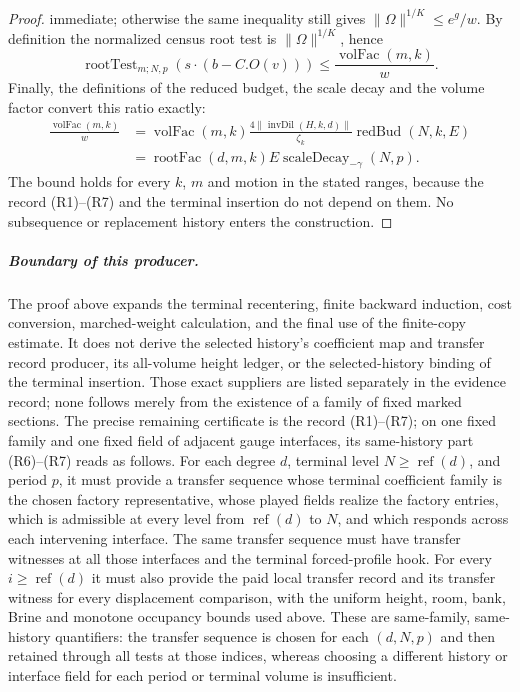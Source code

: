 \begin{proof}
immediate; otherwise the same inequality still gives
$\|\Omega\|^{1/K}\leq e^g/w$. By definition the normalized census root
test is $\|\Omega\|^{1/K}$, hence
\[
 \operatorname{rootTest}_{m;N,p}(s\cdot(b-C.O(v)))
       \leq \frac{\operatorname{volFac}(m,k)}{w}.
\]
Finally, the definitions of the reduced budget, the scale decay and the volume factor convert this
ratio exactly:
\[\begin{aligned}
 \frac{\operatorname{volFac}(m,k)}{w}
 &=\operatorname{volFac}(m,k)
   \frac{4\|\operatorname{invDil}(H,k,d)\|}{\zeta_k}
   \operatorname{redBud}(N,k,E)\\
 &=\operatorname{rootFac}(d,m,k)E\operatorname{scaleDecay}_{-\gamma}(N,p).
\end{aligned}\]
The bound holds for every $k$, $m$ and motion in the stated ranges,
because the record (R1)--(R7) and the terminal insertion do not depend on them. No
subsequence or replacement history enters the construction.
\end{proof}

\subparagraph{Boundary of this producer.}
The proof above expands the terminal recentering, finite backward induction,
cost conversion, marched-weight calculation, and the final use of the
finite-copy estimate. It does not derive the selected history's coefficient map and transfer record
producer, its all-volume height ledger, or the selected-history binding of
the terminal insertion. Those exact suppliers are listed separately in the
evidence record; none follows merely from the existence of a family of fixed marked sections.
The precise remaining certificate is the record (R1)--(R7); on one fixed
family and one fixed field of adjacent gauge interfaces, its same-history part
(R6)--(R7) reads as follows. For each degree $d$, terminal level
$N\geq\operatorname{ref}(d)$, and period $p$, it must provide a transfer sequence whose
terminal coefficient family is the chosen factory representative, whose played fields
realize the factory entries, which is admissible at every level from
$\operatorname{ref}(d)$ to $N$, and which responds across each intervening
interface. The same transfer sequence must have transfer witnesses at all those interfaces and the
terminal forced-profile hook. For every $i\geq\operatorname{ref}(d)$ it
must also provide the paid local transfer record and its transfer witness for every displacement
comparison, with the uniform height, room, bank, Brine and monotone
occupancy bounds used above. These are same-family, same-history
quantifiers: the transfer sequence is chosen for each $(d,N,p)$ and then retained
through all tests at those indices, whereas choosing a different history
or interface field for each period or terminal volume is insufficient.

